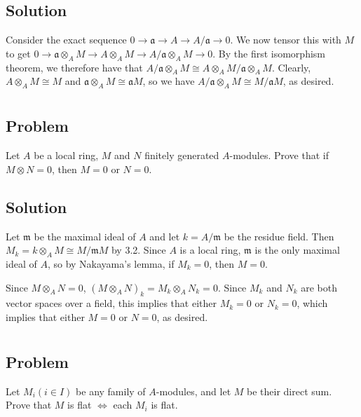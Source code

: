 \documentclass[book,12pt,oneside,openany]{memoir}
\begin{document}
\subsection{Solution}
Consider the exact sequence $0 \rightarrow \mathfrak{a} \rightarrow A \rightarrow A/\mathfrak{a} \rightarrow 0$. We now tensor this with $M$ to get $0 \rightarrow \mathfrak{a} \otimes_{A} M \rightarrow A \otimes_{A} M \rightarrow A/\mathfrak{a} \otimes_{A} M \rightarrow 0$. By the first isomorphism theorem, we therefore have that $A/\mathfrak{a} \otimes_{A} M \cong A \otimes_{A} M / \mathfrak{a} \otimes_A M$. Clearly, $A \otimes_A M \cong M$ and $\mathfrak{a} \otimes_{A} M \cong \mathfrak{a} M$, so we have $A/\mathfrak{a} \otimes_{A} M \cong M/\mathfrak{a}M$, as desired.

\section{}

\subsection{Problem}
Let $A$ be a local ring, $M$ and $N$ finitely generated $A$-modules. Prove that if $M \otimes N = 0$, then $M = 0$ or $N = 0$.

\subsection{Solution}
Let $\mathfrak{m}$ be the maximal ideal of $A$ and let $k = A/\mathfrak{m}$ be the residue field. Then $M_k = k \otimes_A M \cong M/\mathfrak{m}M$ by 3.2. Since $A$ is a local ring, $\mathfrak{m}$ is the only maximal ideal of $A$, so by Nakayama's lemma, if $M_k = 0$, then $M = 0$. 

Since $M \otimes_{A} N = 0$, $(M \otimes_{A} N)_k = M_k \otimes_{A} N_k = 0$. Since $M_k$ and $N_k$ are both vector spaces over a field, this implies that either $M_k = 0$ or $N_k = 0$, which implies that either $M = 0$ or $N= 0$, as desired.

\section{}
\subsection{Problem}
Let $M_i (i \in I)$ be any family of $A$-modules, and let $M$ be their direct sum. Prove that $M$ is flat $\Leftrightarrow$ each $M_i$ is flat.
\end{document}
